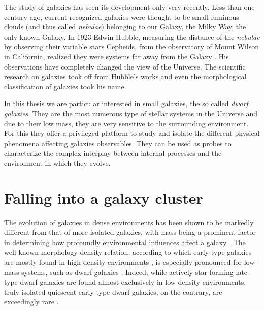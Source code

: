 The study of galaxies has seen its development only very recently.
Less than one century ago, current recognized galaxies were thought to be small luminous clouds (and thus called \emph{nebulae}) belonging to our Galaxy, the Milky Way, the only known Galaxy.
In 1923 Edwin Hubble, measuring the distance of the \emph{nebulae} by observing their variable stars Cepheids, from the observatory of Mount Wilson in California, realized they were systems far away from the Galaxy \citep{Hubble1929}.
His observations have completely changed the view of the Universe.
The scientific research on galaxies took off from Hubble's works and even the morphological classification of galaxies took his name.

In this thesis we are particular interested in small galaxies, the so called \emph{dwarf galaxies}.
They are the most numerous type of stellar systems in the Universe and due to their low mass, they are very sensitive to the surrounding environment.
For this they offer a privileged platform to study and isolate the different physical phenomena affecting galaxies observables.
They can be used as probes to characterize the complex interplay between internal processes and the environment in which they evolve.



\section{Falling into a galaxy cluster}

The evolution of galaxies in dense environments has been shown to be markedly different from that of more isolated galaxies, with mass being a prominent factor in determining how profoundly environmental influences affect a galaxy \citep{Boselli2006, Grossi2018a}.
The well-known morphology-density relation, according to which early-type galaxies are mostly found in high-density environments \citep{Dressler1980, Dressler1997}, is especially pronounced for low-mass systems, such as dwarf galaxies \citep{McConnachie2012}.
Indeed, while actively star-forming late-type dwarf galaxies are found almost exclusively in low-density environments, truly isolated quiescent early-type dwarf galaxies, on the contrary, are exceedingly rare \citep{Binggeli1990, Karachentseva2010, Geha2012}.

